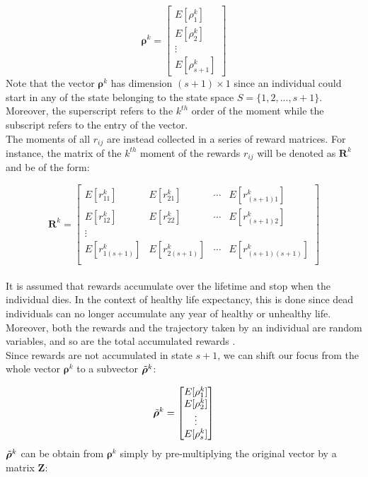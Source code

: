 \documentclass[\main/main.tex]{subfiles}
\begin{document}
\begin{equation}
 \bm{\rho}^{k} =
\begin{bmatrix}
E[\rho^k_1]\\
E[\rho^k_2]\\
\vdots\\
E[\rho^k_{s+1}]
\end{bmatrix}
\end{equation}
Note that the vector $\bm{\rho}^k$ has dimension $(s+1) \times 1$ since an individual could start in any of the state belonging to the state space $S = \{1,2,..., s+1\}$. Moreover, the superscript refers to the $k^{th}$ order of the moment while the subscript refers to the entry of the vector. \\
The moments of all $r_{ij}$ are instead collected in a series of reward matrices. For instance, the matrix of the $k^{th}$ moment of the rewards $r_{ij}$ will be denoted as $\mathbf{R}^k$ and be of the form:

\begin{equation}
 \bm{R}^{k} = 
 \begin{bmatrix}
  E[r^k_{11}]  &  E[r^k_{21}]  & \cdots &  E[r^k_{(s+1)1}] \\
E[r^k_{12}]  &  E[r^k_{22}]  & \cdots &  E[r^k_{(s+1)2}] \\
\vdots & & &\\
  E[r^k_{1(s+1)}]  &  E[r^k_{2(s+1)}]  & \cdots &  E[r^k_{(s+1)(s+1)}] \\
 \end{bmatrix}
\end{equation}
\\

\noindent It is assumed that rewards accumulate over the lifetime and stop when the individual dies. In the context of healthy life expectancy, this is done since dead individuals  can no longer accumulate any year of healthy or unhealthy life. Moreover, both the rewards and the trajectory taken by an individual are random variables, and so are the total accumulated rewards \citep{Caswell2011}.\\
Since rewards are not accumulated in state $s+1$, we can shift our focus from the whole vector $\bm{\rho}^k$ to a subvector $\Tilde{\bm{\rho}}^k$:

\begin{equation}
\Tilde{\bm{\rho}}^k =
\begin{bmatrix}
E[\rho^k_1]\\
E[\rho^k_2]\\
\vdots\\
E[\rho^k_{s}]
\end{bmatrix}
\end{equation}
$\Tilde{\bm{\rho}}^k$ can be obtain from $\bm{\rho}^k$ simply by pre-multiplying the original vector by a matrix $\mathbf{Z}$: 
\end{document}
